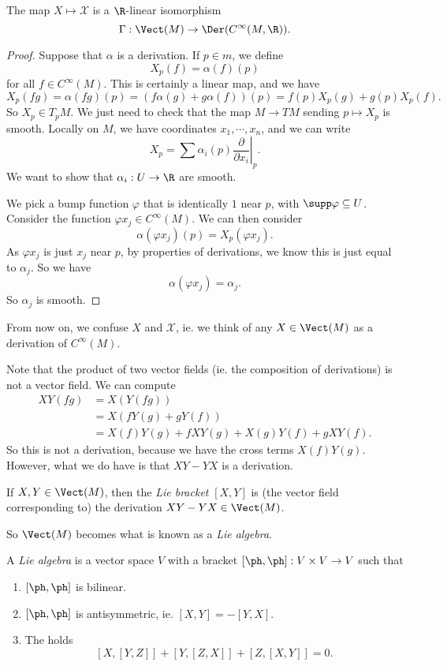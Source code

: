 \documentclass[a4paper]{article}
\begin{document}
\begin{lemma}
  The map $X \mapsto \mathcal{X}$ is a $\R$-linear isomorphism
  \[
    \Gamma: \Vect(M) \to \Der(C^\infty(M, \R)).
  \]
\end{lemma}

\begin{proof}
  Suppose that $\alpha$ is a derivation. If $p \in m$, we define
  \[
    X_p(f) = \alpha(f)(p)
  \]
  for all $f \in C^\infty(M)$. This is certainly a linear map, and we have
  \[
    X_p(fg) = \alpha(fg)(p) = (f\alpha(g) + g\alpha(f))(p) = f(p) X_p(g) + g(p) X_p(f).
  \]
  So $X_p \in T_p M$. We just need to check that the map $M \to TM$ sending $p \mapsto X_p$ is smooth. Locally on $M$, we have coordinates $x_1, \cdots, x_n$, and we can write
  \[
    X_p = \sum \alpha_i(p) \left.\frac{\partial}{\partial x_i}\right|_p.
  \]
  We want to show that $\alpha_i: U \to \R$ are smooth.

  We pick a bump function $\varphi$ that is identically $1$ near $p$, with $\supp \varphi \subseteq U$. Consider the function $\varphi x_j \in C^\infty(M)$. We can then consider
  \[
    \alpha(\varphi x_j)(p) = X_p(\varphi x_j).
  \]
  As $\varphi x_j$ is just $x_j$ near $p$, by properties of derivations, we know this is just equal to $\alpha_j$. So we have
  \[
    \alpha(\varphi x_j) = \alpha_j.
  \]
  So $\alpha_j$ is smooth.
\end{proof}

From now on, we confuse $X$ and $\mathcal{X}$, ie. we think of any $X \in \Vect(M)$ as a derivation of $C^\infty(M)$.

Note that the product of two vector fields (ie. the composition of derivations) is not a vector field. We can compute
\begin{align*}
  XY(fg) &= X(Y(fg)) \\
  &= X(fY(g) + gY(f)) \\
  &= X(f) Y(g) + fXY(g) + X(g) Y(f) + g XY(f).
\end{align*}
So this is not a derivation, because we have the cross terms $X(f) Y(g)$. However, what we do have is that $XY - YX$ is a derivation.
\begin{defi}
  If $X, Y \in \Vect(M)$, then the \emph{Lie bracket} $[X, Y]$ is (the vector field corresponding to) the derivation $XY - YX \in \Vect(M)$.
\end{defi}

So $\Vect(M)$ becomes what is known as a \emph{Lie algebra}.
\begin{defi}
  A \emph{Lie algebra} is a vector space $V$ with a bracket $[\ph, \ph]: V \times V \to V$ such that
  \begin{enumerate}
    \item $[\ph, \ph]$ is bilinear.
    \item $[\ph, \ph]$ is antisymmetric, ie. $[X, Y] = -[Y, X]$.
    \item The  holds
      \[
        [X, [Y, Z]] + [Y, [Z, X]] + [Z, [X, Y]] = 0.
      \]
  \end{enumerate}
\end{defi}
\end{document}
